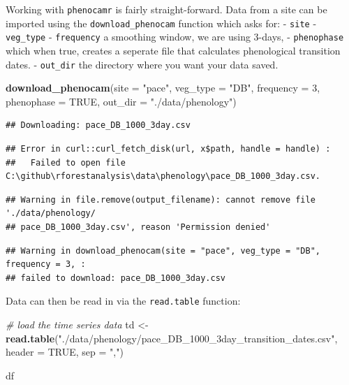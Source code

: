 \documentclass[
]{article}
\newenvironment{Shaded}{\begin{snugshade}}{\end{snugshade}}
\newcommand{\CommentTok}[1]{\textcolor[rgb]{0.56,0.35,0.01}{\textit{#1}}}
\newcommand{\DataTypeTok}[1]{\textcolor[rgb]{0.13,0.29,0.53}{#1}}
\newcommand{\DecValTok}[1]{\textcolor[rgb]{0.00,0.00,0.81}{#1}}
\newcommand{\KeywordTok}[1]{\textcolor[rgb]{0.13,0.29,0.53}{\textbf{#1}}}
\newcommand{\NormalTok}[1]{#1}
\newcommand{\OtherTok}[1]{\textcolor[rgb]{0.56,0.35,0.01}{#1}}
\newcommand{\StringTok}[1]{\textcolor[rgb]{0.31,0.60,0.02}{#1}}
\begin{document}
Working with \texttt{phenocamr} is fairly straight-forward. Data from a
site can be imported using the \texttt{download\_phenocam} function
which asks for: - \texttt{site} - \texttt{veg\_type} -
\texttt{frequency} a smoothing window, we are using 3-days, -
\texttt{phenophase} which when true, creates a seperate file that
calculates phenological transition dates. - \texttt{out\_dir} the
directory where you want your data saved.

\begin{Shaded}
\begin{Highlighting}[]
\KeywordTok{download\_phenocam}\NormalTok{(}\DataTypeTok{site =} \StringTok{"pace"}\NormalTok{,}
                  \DataTypeTok{veg\_type =} \StringTok{"DB"}\NormalTok{,}
                  \DataTypeTok{frequency =} \DecValTok{3}\NormalTok{,}
                  \DataTypeTok{phenophase =} \OtherTok{TRUE}\NormalTok{,}
                  \DataTypeTok{out\_dir =} \StringTok{"./data/phenology"}\NormalTok{)}
\end{Highlighting}
\end{Shaded}

\begin{verbatim}
## Downloading: pace_DB_1000_3day.csv
\end{verbatim}

\begin{verbatim}
## Error in curl::curl_fetch_disk(url, x$path, handle = handle) : 
##   Failed to open file C:\github\rforestanalysis\data\phenology\pace_DB_1000_3day.csv.
\end{verbatim}

\begin{verbatim}
## Warning in file.remove(output_filename): cannot remove file './data/phenology/
## pace_DB_1000_3day.csv', reason 'Permission denied'
\end{verbatim}

\begin{verbatim}
## Warning in download_phenocam(site = "pace", veg_type = "DB", frequency = 3, :
## failed to download: pace_DB_1000_3day.csv
\end{verbatim}

Data can then be read in via the \texttt{read.table} function:

\begin{Shaded}
\begin{Highlighting}[]
\CommentTok{\# load the time series data}
\NormalTok{td \textless{}{-}}\StringTok{ }\KeywordTok{read.table}\NormalTok{(}\StringTok{"./data/phenology/pace\_DB\_1000\_3day\_transition\_dates.csv"}\NormalTok{, }\DataTypeTok{header =} \OtherTok{TRUE}\NormalTok{, }\DataTypeTok{sep =} \StringTok{","}\NormalTok{)}

\NormalTok{df}
\end{Highlighting}
\end{Shaded}
\end{document}

